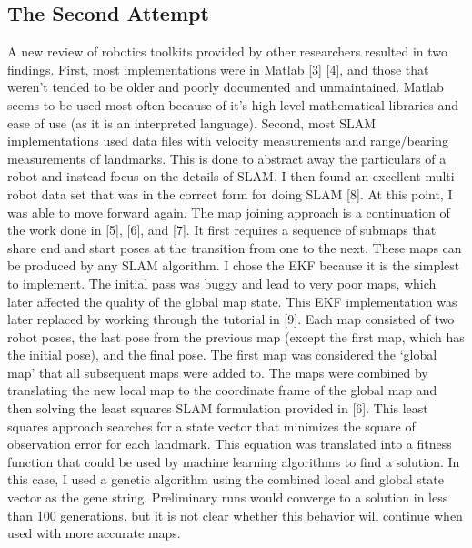 \documentclass[12pt]{article}
\begin{document}
\subsection{The Second Attempt}
A new review of robotics toolkits provided by other researchers resulted in two findings.  First, most implementations were in Matlab [3] [4], and those that weren’t tended to be older and poorly documented and unmaintained.  Matlab seems to be used most often because of it’s high level mathematical libraries and ease of use (as it is an interpreted language).  Second, most SLAM implementations used data files with velocity measurements and range/bearing measurements of landmarks.  This is done to abstract away the particulars of a robot and instead focus on the details of SLAM.  I then found an excellent multi robot data set that was in the correct form for doing SLAM [8].
At this point, I was able to move forward again.  The map joining approach is a continuation of the work done in [5], [6], and [7].  It first requires a sequence of submaps that share end and start poses at the transition from one to the next.  These maps can be produced by any SLAM algorithm.  I chose the EKF because it is the simplest to implement.  The initial pass was buggy and lead to very poor maps, which later affected the quality of the global map state.  This EKF implementation was later replaced by working through the tutorial in [9].  
Each map consisted of two robot poses, the last pose from the previous map (except the first map, which has the initial pose), and the final pose.  The first map was considered the ‘global map’ that all subsequent maps were added to.  The maps were combined by translating the new local map to the coordinate frame of the global map and then solving the least squares SLAM formulation provided in [6].  This least squares approach searches for a state vector that minimizes the square of observation error for each landmark.  This equation was translated into a fitness function that could be used by machine learning algorithms to find a solution.  In this case, I used a genetic algorithm using the combined local and global state vector as the gene string.  Preliminary runs would converge to a solution in less than 100 generations, but it is not clear whether this behavior will continue when used with more accurate maps.  
\end{document}
